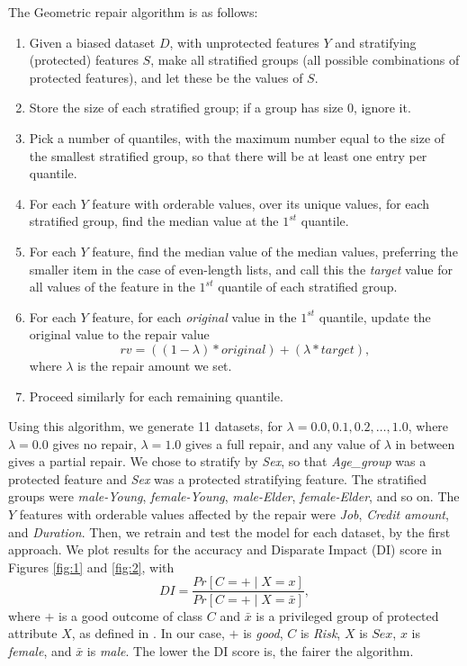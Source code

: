 \documentclass[conference]{IEEEtran}
\begin{document}
The Geometric repair algorithm is as follows:
\begin{enumerate}
    \item Given a biased dataset $D$, with unprotected features $Y$ and stratifying (protected) features $S$, make all stratified groups (all possible combinations of protected features), and let these be the values of $S$.
    \item Store the size of each stratified group; if a group has size 0, ignore it.
    \item Pick a number of quantiles, with the maximum number equal to the size of the smallest stratified group, so that there will be at least one entry per quantile. 
    \item For each $Y$ feature with orderable values, over its unique values, for each stratified group, find the median value at the $1^{st}$ quantile.
    \item For each $Y$ feature, find the median value of the median values, preferring the smaller item in the case of even-length lists, and call this the \emph{target} value for all values of the feature in the $1^{st}$ quantile of each stratified group.
    \item For each $Y$ feature, for each \emph{original} value in the $1^{st}$ quantile, update the original value to the repair value $$rv = ((1 - \lambda) * original) + (\lambda * target),$$ where $\lambda$ is the repair amount we set. 
    \item Proceed similarly for each remaining quantile.     
\end{enumerate}


Using this algorithm, we generate 11 datasets, for $\lambda = 0.0, 0.1, 0.2, \dots, 1.0$, where $\lambda = 0.0$ gives no repair, $\lambda = 1.0$ gives a full repair, and any value of $\lambda$ in between gives a partial repair. We chose to stratify by \emph{Sex}, so that \emph{Age\_group} was a protected feature and \emph{Sex} was a protected stratifying feature. The stratified groups were \emph{male-Young}, \emph{female-Young}, \emph{male-Elder}, \emph{female-Elder}, and so on. The $Y$ features with orderable values affected by the repair were \emph{Job}, \emph{Credit amount}, and \emph{Duration}. Then, we retrain and test the model for each dataset, by the first approach. We plot results for the accuracy and Disparate Impact (DI) score in Figures \ref{fig:1} and \ref{fig:2}, with $$DI = \frac{Pr \left[ C=+ \mid X=x \right]}{Pr \left[ C=+ \mid X=\bar{x} \right]},$$ where $+$ is a good outcome of class $C$ and $\bar{x}$ is a privileged group of protected attribute $X$, as defined in \cite{Feldman2015ComputationalFP}. In our case, $+$ is \emph{good}, $C$ is \emph{Risk}, $X$ is $Sex$, $x$ is \emph{female}, and $\bar{x}$ is \emph{male}. The lower the DI score is, the fairer the algorithm.
\end{document}

